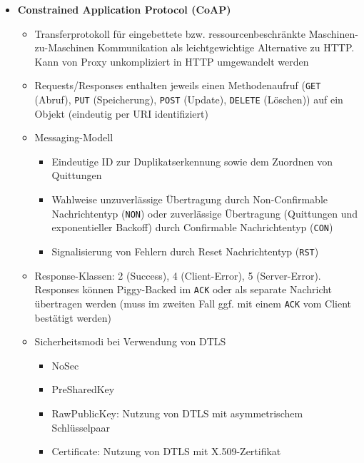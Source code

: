 \begin{itemize}
\begin{itemize}
	\end{itemize}
	\item \textbf{Constrained Application Protocol (CoAP)}
	\begin{itemize}
		\item Transferprotokoll für eingebettete bzw. ressourcenbeschränkte Maschinen-zu-Maschinen Kommunikation als leichtgewichtige Alternative zu HTTP. Kann von Proxy unkompliziert in HTTP umgewandelt werden
		\item Requests/Responses enthalten jeweils einen Methodenaufruf (\texttt{GET} (Abruf), \texttt{PUT} (Speicherung), \texttt{POST} (Update), \texttt{DELETE} (Löschen)) auf ein Objekt (eindeutig per URI identifiziert)
		\item Messaging-Modell
		\begin{itemize}
			\item Eindeutige ID zur Duplikatserkennung sowie dem Zuordnen von Quittungen
			\item Wahlweise unzuverlässige Übertragung durch Non-Confirmable Nachrichtentyp (\texttt{NON}) oder zuverlässige Übertragung (Quittungen und exponentieller Backoff) durch Confirmable Nachrichtentyp (\texttt{CON})
			\item Signalisierung von Fehlern durch Reset Nachrichtentyp (\texttt{RST})
		\end{itemize}
		\item Response-Klassen: 2 (Success), 4 (Client-Error), 5 (Server-Error). Responses können Piggy-Backed im \texttt{ACK} oder als separate Nachricht übertragen werden (muss im zweiten Fall ggf. mit einem \texttt{ACK} vom Client bestätigt werden)
		\item Sicherheitsmodi bei Verwendung von DTLS
		\begin{itemize}
			\item NoSec
			\item PreSharedKey
			\item RawPublicKey: Nutzung von DTLS mit asymmetrischem Schlüsselpaar
			\item Certificate: Nutzung von DTLS mit X.509-Zertifikat
		\end{itemize}
	\end{itemize}
\end{itemize}

